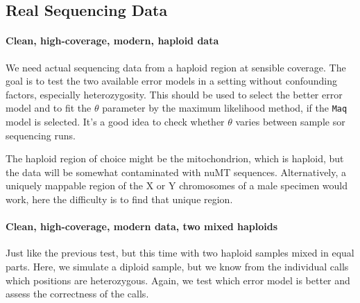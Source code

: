 \documentclass{article}
\begin{document}

\subsection{Real Sequencing Data}

\paragraph{Clean, high-coverage, modern, haploid data}

We need actual sequencing data from a haploid region at sensible
coverage.  The goal is to test the two available error models in a
setting without confounding factors, especially heterozygosity.  This
should be used to select the better error model and to fit the $\theta$
parameter by the maximum likelihood method, if the \texttt{Maq} model is
selected.  It's a good idea to check whether $\theta$ varies between
sample sor sequencing runs.

The haploid region of choice might be the mitochondrion, which is
haploid, but the data will be somewhat contaminated with nuMT sequences.
Alternatively, a uniquely mappable region of the X or Y chromosomes of a
male specimen would work, here the difficulty is to find that unique
region.


\paragraph{Clean, high-coverage, modern data, two mixed haploids}

Just like the previous test, but this time with two haploid samples
mixed in equal parts.  Here, we simulate a diploid sample, but we know
from the individual calls which positions are heterozygous.  Again, we
test which error model is better and assess the correctness of the
calls.

\end{document}
